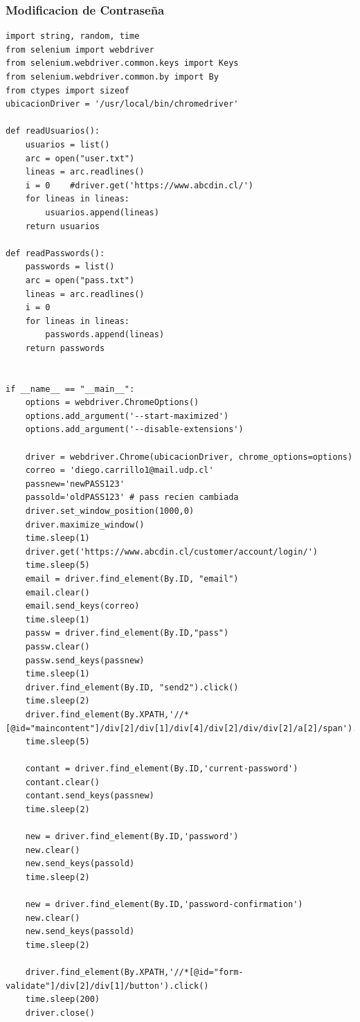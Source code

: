 \documentclass{article}
\begin{document}
\newpage
\subsubsection{Modificacion de Contraseña}
\begin{lstlisting}[lenguaje=py]
import string, random, time
from selenium import webdriver
from selenium.webdriver.common.keys import Keys
from selenium.webdriver.common.by import By
from ctypes import sizeof
ubicacionDriver = '/usr/local/bin/chromedriver'

def readUsuarios():
    usuarios = list()
    arc = open("user.txt")
    lineas = arc.readlines()
    i = 0    #driver.get('https://www.abcdin.cl/')
    for lineas in lineas:
        usuarios.append(lineas)
    return usuarios

def readPasswords():
    passwords = list()
    arc = open("pass.txt")
    lineas = arc.readlines()
    i = 0
    for lineas in lineas:
        passwords.append(lineas)
    return passwords


if __name__ == "__main__":
    options = webdriver.ChromeOptions()
    options.add_argument('--start-maximized')
    options.add_argument('--disable-extensions')

    driver = webdriver.Chrome(ubicacionDriver, chrome_options=options)
    correo = 'diego.carrillo1@mail.udp.cl'
    passnew='newPASS123'
    passold='oldPASS123' # pass recien cambiada
    driver.set_window_position(1000,0)
    driver.maximize_window()
    time.sleep(1)
    driver.get('https://www.abcdin.cl/customer/account/login/')
    time.sleep(5)
    email = driver.find_element(By.ID, "email")
    email.clear()
    email.send_keys(correo)
    time.sleep(1)
    passw = driver.find_element(By.ID,"pass")
    passw.clear()
    passw.send_keys(passnew)
    time.sleep(1)
    driver.find_element(By.ID, "send2").click()
    time.sleep(2)
    driver.find_element(By.XPATH,'//*[@id="maincontent"]/div[2]/div[1]/div[4]/div[2]/div/div[2]/a[2]/span').click()
    time.sleep(5)
    
    contant = driver.find_element(By.ID,'current-password')
    contant.clear()
    contant.send_keys(passnew)
    time.sleep(2)

    new = driver.find_element(By.ID,'password')
    new.clear()
    new.send_keys(passold)
    time.sleep(2)

    new = driver.find_element(By.ID,'password-confirmation')
    new.clear()
    new.send_keys(passold)
    time.sleep(2)

    driver.find_element(By.XPATH,'//*[@id="form-validate"]/div[2]/div[1]/button').click()
    time.sleep(200)
    driver.close()
\end{lstlisting}
\end{document}
